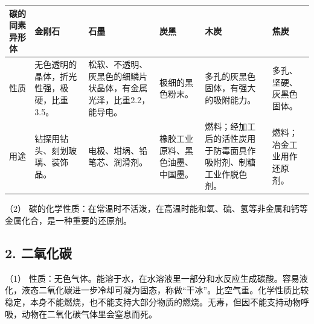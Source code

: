 {\def\LTcaptype{none} %
\begin{longtable}[]{@{}
  >{\raggedright\arraybackslash}p{}
  >{\raggedright\arraybackslash}p{}
  >{\raggedright\arraybackslash}p{}
  >{\raggedright\arraybackslash}p{}
  >{\raggedright\arraybackslash}p{}
  >{\raggedright\arraybackslash}p{}@{}}
\toprule\noalign{}
\begin{minipage}[b]{\linewidth}\raggedright
碳的同素异形体
\end{minipage} & \begin{minipage}[b]{\linewidth}\raggedright
金刚石
\end{minipage} & \begin{minipage}[b]{\linewidth}\raggedright
石墨
\end{minipage} & \begin{minipage}[b]{\linewidth}\raggedright
炭黑
\end{minipage} & \begin{minipage}[b]{\linewidth}\raggedright
木炭
\end{minipage} & \begin{minipage}[b]{\linewidth}\raggedright
焦炭
\end{minipage} \\
\midrule\noalign{}
\endhead
\bottomrule\noalign{}
\endlastfoot
性质 & 无色透明的晶体，折光性强，极硬，比重3.5。 &
松软、不透明、灰黑色的细鳞片状晶体，有金属光泽，比重2.2，能导电。 &
极细的黑色粉末。 & 多孔的灰黑色固体，有强大的吸附能力。 &
多孔、坚硬、灰黑色固体。 \\
用途 & 钻探用钻头、刻划玻璃、装饰品。 & 电极、坩埚、铅笔芯、润滑剂。 &
橡胶工业原料、黑色油墨、中国墨。 &
燃料；经加工后的活性炭用于防毒面具作吸附剂、制糖工业作脱色剂。 &
燃料；冶金工业用作还原剂。 \\
\end{longtable}
}

（2）
碳的化学性质：在常温时不活泼，在高温时能和氧、硫、氢等非金属和钙等金属化合，是一种重要的还原剂。

\subsection{2. 二氧化碳}

（1）
性质：无色气体。能溶于水，在水溶液里一部分和水反应生成碳酸。容易液化，液态二氧化碳进一步冷却可凝为固态，称做``干冰''。比空气重。化学性质比较稳定，本身不能燃烧，也不能支持大部分物质的燃烧。无毒，但因不能支持动物呼吸，动物在二氧化碳气体里会窒息而死。

